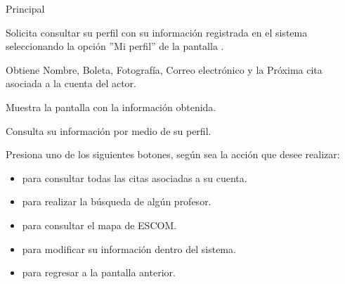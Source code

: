 \begin{UCtrayectoria}{Principal}

	\UCpaso [\UCactor] Solicita consultar su perfil con su información registrada en el sistema seleccionando la opción ''Mi perfil'' de la pantalla .

	\UCpaso Obtiene Nombre, Boleta, Fotografía, Correo electrónico y la Próxima cita asociada a la cuenta del actor.  

	\UCpaso Muestra la pantalla  con la información obtenida.

	\UCpaso[\UCactor] Consulta su información por medio de su perfil.

	\UCpaso [\UCactor] Presiona uno de los siguientes botones, según sea la acción que desee realizar: 
	\begin{itemize}
		\item {} para consultar todas las citas asociadas a su cuenta.
		\item {} para realizar la búsqueda de algún profesor.
		\item {} para consultar el mapa de ESCOM.
		\item {} para modificar su información dentro del sistema.
		\item {} para regresar a la pantalla anterior.  
	\end{itemize}

\end{UCtrayectoria}



